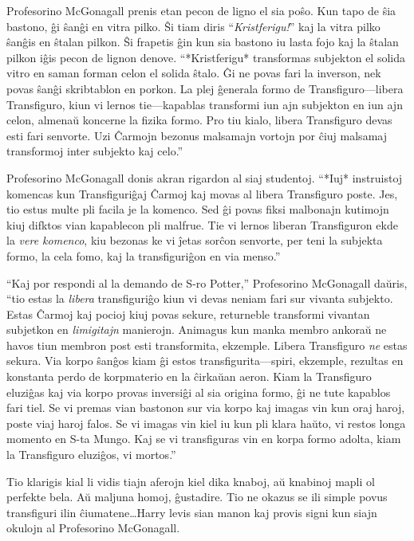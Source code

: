 Profesorino McGonagall prenis etan pecon de ligno el sia poŝo. Kun
tapo de ŝia bastono, ĝi ŝanĝi en vitra pilko. Ŝi tiam diris
``\emph{Kristferigu!}'' kaj la vitra pilko ŝanĝis en ŝtalan pilkon. Ŝi
frapetis ĝin kun sia bastono iu lasta fojo kaj la ŝtalan pilkon iĝis
pecon de lignon denove. ``*Kristferigu* transformas subjekton el
solida vitro en saman forman celon el solida ŝtalo. Ĝi ne povas fari
la inverson, nek povas ŝanĝi skribtablon en porkon. La plej ĝenerala
formo de Transfiguro—libera Transfiguro, kiun vi lernos
tie—kapablas transformi iun ajn subjekton en iun ajn celon, almenaŭ
koncerne la fizika formo. Pro tiu kialo, libera Transfiguro devas
esti fari senvorte. Uzi Ĉarmojn bezonus malsamajn vortojn por ĉiuj
malsamaj transformoj inter subjekto kaj celo.''

Profesorino McGonagall donis akran rigardon al siaj studentoj. ``*Iuj*
instruistoj komencas kun Transfiguriĝaj Ĉarmoj kaj movas al libera
Transfiguro poste. Jes, tio estus multe pli facila je la
komenco. Sed ĝi povas fiksi malbonajn kutimojn kiuj difktos vian
kapablecon pli malfrue. Tie vi lernos liberan Transfiguron ekde la
\emph{vere komenco}, kiu bezonas ke vi ĵetas sorĉon senvorte, per teni
la subjekta formo, la cela fomo, kaj la transfiguriĝon en via menso.''

``Kaj por respondi al la demando de S-ro Potter,'' Profesorino
McGonagall daŭris, ``tio estas la \emph{libera} transfiguriĝo kiun vi
devas neniam fari sur vivanta subjekto. Estas Ĉarmoj kaj pocioj kiuj
povas sekure, returneble transformi vivantan subjetkon en
\emph{limigitajn} manierojn. Animagus kun manka membro ankoraŭ ne
havos tiun membron post esti transformita, ekzemple. Libera
Transfiguro \emph{ne} estas sekura. Via korpo ŝanĝos kiam ĝi estos
transfigurita—spiri, ekzemple, rezultas en konstanta perdo de
korpmaterio en la ĉirkaŭan aeron. Kiam la Transfiguro eluziĝas kaj
via korpo provas inversiĝi al sia origina formo, ĝi ne tute kapablos
fari tiel. Se vi premas vian bastonon sur via korpo kaj imagas vin kun
oraj haroj, poste viaj haroj falos. Se vi imagas vin kiel iu kun pli
klara haŭto, vi restos longa momento en S-ta Mungo. Kaj se vi
transfiguras vin en korpa formo adolta, kiam la Transfiguro eluziĝos,
vi mortos.''

Tio klarigis kial li vidis tiajn aferojn kiel dika knaboj, aŭ knabinoj mapli ol
perfekte bela. Aŭ maljuna homoj, ĝustadire. Tio ne okazus se ili
simple povus transfiguri ilin ĉiumatene\ldots Harry levis sian manon
kaj provis signi kun siajn okulojn al Profesorino McGonagall.

